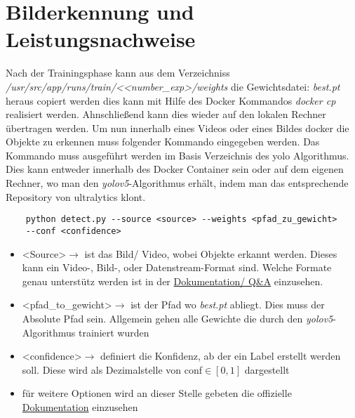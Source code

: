 \chapter{Bilderkennung und Leistungsnachweise}
Nach der Trainingsphase kann aus dem Verzeichniss \textit{/usr/src/app/runs/train/<\textless number\_exp\textgreater/weights} die Gewichtsdatei: \textit{best.pt} heraus copiert werden dies kann mit Hilfe des Docker Kommandos \textit{docker cp} realisiert werden. Ahnschließend kann dies wieder auf den lokalen Rechner übertragen werden. Um nun innerhalb eines Videos oder eines Bildes docker die Objekte zu erkennen muss folgender Kommando eingegeben werden. Das Kommando muss ausgeführt werden im Basis Verzeichnis des \ac{yolo} Algorithmus. Dies kann entweder innerhalb des Docker Container sein oder auf dem eigenen Rechner, wo man den \textit{\ac{yolo}v5}-Algorithmus erhält, indem man das entsprechende Repository von ultralytics klont.

\begin{verbatim}
    python detect.py --source <source> --weights <pfad_zu_gewicht> 
    --conf <confidence>
\end{verbatim}

\begin{itemize}
    \item \textless Source\textgreater $\rightarrow$ ist das Bild/ Video, wobei Objekte erkannt werden. Dieses kann ein Video-, Bild-, oder Datenstream-Format sind. Welche Formate genau unterstütz werden ist in der \href{https://github.com/ultralytics/yolov5/issues/6855}{Dokumentation/ Q\&A} einzusehen.
    \item \textless pfad\_to\_gewicht\textgreater $\rightarrow$ ist der Pfad wo \textit{best.pt} abliegt. Dies muss der Absolute Pfad sein. Allgemein gehen alle Gewichte die durch den \textit{\ac{yolo}v5}-Algorithmus trainiert wurden
    \item \textless confidence\textgreater  $\rightarrow$ definiert die Konfidenz, ab der ein Label erstellt werden soll. Diese wird als Dezimalstelle von conf$\in [0,1]$ dargestellt
    \item für weitere Optionen wird an dieser Stelle gebeten die offizielle \href{https://github.com/ultralytics/yolov5/blob/master/detect.py}{Dokumentation} einzusehen
\end{itemize}